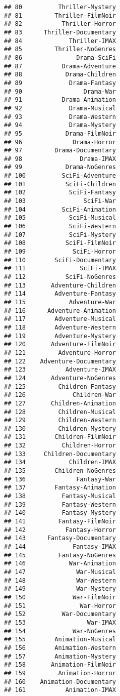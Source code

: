\documentclass[
]{article}
\begin{document}
\begin{verbatim}
## 80          Thriller-Mystery
## 81         Thriller-FilmNoir
## 82           Thriller-Horror
## 83      Thriller-Documentary
## 84             Thriller-IMAX
## 85         Thriller-NoGenres
## 86               Drama-SciFi
## 87           Drama-Adventure
## 88            Drama-Children
## 89             Drama-Fantasy
## 90                 Drama-War
## 91           Drama-Animation
## 92             Drama-Musical
## 93             Drama-Western
## 94             Drama-Mystery
## 95            Drama-FilmNoir
## 96              Drama-Horror
## 97         Drama-Documentary
## 98                Drama-IMAX
## 99            Drama-NoGenres
## 100          SciFi-Adventure
## 101           SciFi-Children
## 102            SciFi-Fantasy
## 103                SciFi-War
## 104          SciFi-Animation
## 105            SciFi-Musical
## 106            SciFi-Western
## 107            SciFi-Mystery
## 108           SciFi-FilmNoir
## 109             SciFi-Horror
## 110        SciFi-Documentary
## 111               SciFi-IMAX
## 112           SciFi-NoGenres
## 113       Adventure-Children
## 114        Adventure-Fantasy
## 115            Adventure-War
## 116      Adventure-Animation
## 117        Adventure-Musical
## 118        Adventure-Western
## 119        Adventure-Mystery
## 120       Adventure-FilmNoir
## 121         Adventure-Horror
## 122    Adventure-Documentary
## 123           Adventure-IMAX
## 124       Adventure-NoGenres
## 125         Children-Fantasy
## 126             Children-War
## 127       Children-Animation
## 128         Children-Musical
## 129         Children-Western
## 130         Children-Mystery
## 131        Children-FilmNoir
## 132          Children-Horror
## 133     Children-Documentary
## 134            Children-IMAX
## 135        Children-NoGenres
## 136              Fantasy-War
## 137        Fantasy-Animation
## 138          Fantasy-Musical
## 139          Fantasy-Western
## 140          Fantasy-Mystery
## 141         Fantasy-FilmNoir
## 142           Fantasy-Horror
## 143      Fantasy-Documentary
## 144             Fantasy-IMAX
## 145         Fantasy-NoGenres
## 146            War-Animation
## 147              War-Musical
## 148              War-Western
## 149              War-Mystery
## 150             War-FilmNoir
## 151               War-Horror
## 152          War-Documentary
## 153                 War-IMAX
## 154             War-NoGenres
## 155        Animation-Musical
## 156        Animation-Western
## 157        Animation-Mystery
## 158       Animation-FilmNoir
## 159         Animation-Horror
## 160    Animation-Documentary
## 161           Animation-IMAX

\end{verbatim}
\end{document}
